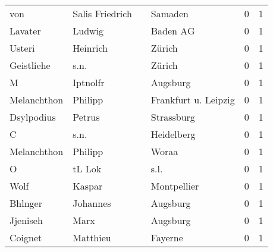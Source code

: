 \begin{tabular}{llllrr}
                      von &                    Salis Friedrich &             &                                     Samaden &          0 &         1 \\
                  Lavater &                             Ludwig &             &                                    Baden AG &          0 &         1 \\
                   Usteri &                           Heinrich &             &                                      Zürich &          0 &         1 \\
               Geistliehe &                               s.n. &             &                                      Zürich &          0 &         1 \\
                        M &                           Iptnolfr &             &                                    Augsburg &          0 &         1 \\
              Melanchthon &                            Philipp &             &                        Frankfurt u. Leipzig &          0 &         1 \\
               Dsylpodius &                             Petrus &             &                                  Strassburg &          0 &         1 \\
                        C &                               s.n. &             &                                  Heidelberg &          0 &         1 \\
              Melanchthon &                            Philipp &             &                                       Woraa &          0 &         1 \\
                        O &                             tL Lok &             &                                        s.l. &          0 &         1 \\
                     Wolf &                             Kaspar &             &                                 Montpellier &          0 &         1 \\
                  Bhlnger &                           Johannes &             &                                    Augsburg &          0 &         1 \\
                 Jjeniseh &                               Marx &             &                                    Augsburg &          0 &         1 \\
                  Coignet &                           Matthieu &             &                                     Fayerne &          0 &         1 \\

\end{tabular}
